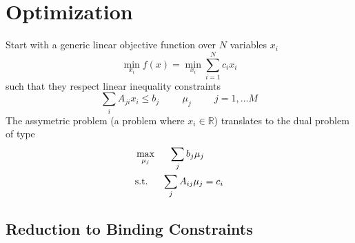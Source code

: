 \documentclass[a4paper,10pt]{article}
\begin{document}
\section{Optimization}


Start with a generic linear objective function over $N$ variables $x_i$
\begin{equation}
 \min_{x_i} f(x) =  \min_{x_i}  \sum_{i=1}^N c_i x_i
\end{equation}
such that they respect linear inequality constraints
\begin{equation}
  \sum_i A_{ji} x_i \leq b_j \hspace{1cm} \mu_j \hspace{1cm} j=1,\dots M
\end{equation}
The assymetric problem (a problem where $x_i \in \mathbb{R}$) translates to the dual problem of type 
\begin{align}
&\max_{\mu_j} \hspace{15pt} \sum_{j} b_j \mu_j \\ 
&\text{s.t.}\hspace{15pt}  \sum_{j} A_{ij} \mu_j = c_i
\end{align}

\subsection{Reduction to Binding Constraints}
    
\end{document}
